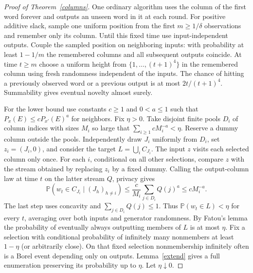 \documentclass[11pt]{article}
\newcommand{\Pp}{\mathbb P}
\begin{document}
\begin{proof}[Proof of Theorem~\ref{columns}]
One ordinary algorithm uses the column of the first word forever and outputs an unseen word in it at each round. For positive additive slack, sample one uniform position from the first $m\ge1/\delta$ observations and remember only its column. Until this fixed time use input-independent outputs. Couple the sampled position on neighboring inputs: with probability at least $1-1/m$ the remembered columns and all subsequent outputs coincide. At time $t\ge m$ choose a uniform height from $\{1,\ldots,(t+1)^4\}$ in the remembered column using fresh randomness independent of the inputs. The chance of hitting a previously observed word or a previous output is at most $2t/(t+1)^4$. Summability gives eventual novelty almost surely.

For the lower bound use constants $c\ge1$ and $0<a\le1$ such that $P_x(E)\le cP_{x'}(E)^a$ for neighbors. Fix $\eta>0$. Take disjoint finite pools $D_i$ of column indices with sizes $M_i$ so large that $\sum_{i\ge1} cM_i^{-a}<\eta$. Reserve a dummy column outside the pools. Independently draw $J_i$ uniformly from $D_i$, set $z_i=(J_i,0)$, and consider the target $L=\bigcup_i C_{J_i}$. The input $z$ visits each selected column only once. For each $i$, conditional on all other selections, compare $z$ with the stream obtained by replacing $z_i$ by a fixed dummy. Calling the output-column law at time $t$ on the latter stream $Q$, privacy gives
\[
 \Pp(w_t\in C_{J_i}\mid (J_h)_{h\ne i})
 \le \frac c{M_i}\sum_{j\in D_i}Q(j)^a
 \le c M_i^{-a}.
\]
The last step uses concavity and $\sum_{j\in D_i}Q(j)\le1$. Thus $\Pp(w_t\in L)<\eta$ for every $t$, averaging over both inputs and generator randomness. By Fatou's lemma the probability of eventually always outputting members of $L$ is at most $\eta$. Fix a selection with conditional probability of infinitely many nonmembers at least $1-\eta$ (or arbitrarily close). On that fixed selection nonmembership infinitely often is a Borel event depending only on outputs. Lemma~\ref{extend} gives a full enumeration preserving its probability up to $\eta$. Let $\eta\downarrow0$.
\end{proof}
\end{document}

